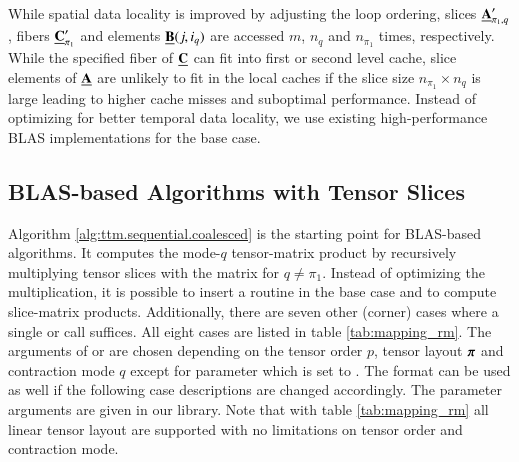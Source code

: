 While spatial data locality is improved by adjusting the loop ordering, slices $\underline{\mathbf{A}}_{\pi_1,q}'$, fibers $\underline{\mathbf{C}}_{\pi_1}'$ and elements $\underline{\mathbf{B}}(j,i_q)$ are accessed $m$, $n_q$ and $n_{\pi_1}$ times, respectively.
While the specified fiber of $\underline{\mathbf{C}}$ can fit into first or second level cache, slice elements of $\underline{\mathbf{A}}$ are unlikely to fit in the local caches if the slice size $n_{\pi_1} \times n_q$ is large leading to higher cache misses and suboptimal performance.
Instead of optimizing for better temporal data locality, we use existing high-performance BLAS implementations for the base case.



\subsection{BLAS-based Algorithms with Tensor Slices}
\label{sec:design:blas.based.algorithm.slices}
Algorithm \ref{alg:ttm.sequential.coalesced} is the starting point for BLAS-based algorithms.
It computes the mode-$q$ tensor-matrix product by recursively multiplying tensor slices with the matrix for $q \neq \pi_1$.
Instead of optimizing the multiplication, it is possible to insert a  routine in the base case and to compute slice-matrix products.
Additionally, there are seven other (corner) cases where a single  or  call suffices.
All eight cases are listed in table \ref{tab:mapping_rm}.
The arguments of  or  are chosen depending on the tensor order $p$, tensor layout $\boldsymbol{\pi}$ and contraction mode $q$ except for parameter  which is set to .
The  format can be used as well if the following case descriptions are changed accordingly.
The parameter arguments are given in our  library.
Note that with table \ref{tab:mapping_rm} all linear tensor layout are supported with no limitations on tensor order and contraction mode.



